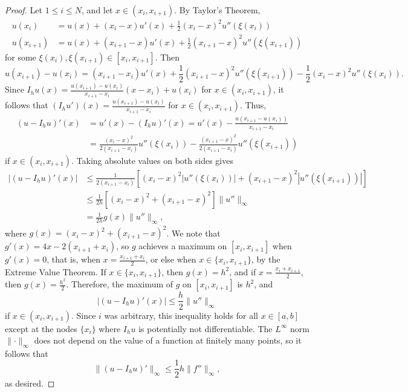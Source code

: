 \documentclass{homework}
\begin{document}
\begin{proof}
		Let $1 \le i \le N$, and let $x \in (x_i, x_{i+1})$. By Taylor's Theorem,
		\begin{align}
			u(x_i) &= u(x) + (x_i -x)u'(x) + \frac{1}{2}(x_i-x)^2u''(\xi(x_i)) \\
			u(x_{i+1}) &= u(x) + (x_{i+1} - x)u'(x) + \frac{1}{2}(x_{i+1}-x)^2u''(\xi(x_{i+1}))
		\end{align}
		for some $\xi(x_i), \xi(x_{i+1}) \in [x_i, x_{i+1}]$. Then
		\begin{equation}
			u(x_{i+1}) - u(x_i) = (x_{i+1} -x_i)u'(x) + \frac{1}{2}(x_{i+1}-x)^2u''(\xi(x_{i+1})) - \frac{1}{2}(x_i-x)^2u''(\xi(x_i)).
		\end{equation}
		Since $I_hu(x) = \frac{u(x_{i+1})- u(x_i)}{x_{i+1} - x_i}(x-x_i) + u(x_i)$ for $x \in (x_i, x_{i+1})$, it follows that $(I_hu')(x) = \frac{u(x_{i+1})- u(x_i)}{x_{i+1} - x_i}$ for $x \in (x_i, x_{i+1})$. Thus,
		\begin{align}
			(u-I_hu)'(x) &= u'(x) - (I_hu)'(x) = u'(x) - \frac{u(x_{i+1} - u(x_i))}{x_{i+1}-x_i} \\
			&= \frac{(x_i-x)^2}{2(x_{i+1}-x_i)}u''(\xi(x_i)) - \frac{(x_{i+1}-x)^2}{2(x_{i+1}-x_i)}u''(\xi(x_{i+1}))
		\end{align}
		if $x \in (x_i, x_{i+1})$. Taking absolute values on both sides gives
		\begin{align}
			|(u-I_hu)'(x)| &\le \frac{1}{2(x_{i+1}-x_i)}\left[(x_i-x)^2|u''(\xi(x_i))| + (x_{i+1}-x)^2|u''(\xi(x_{i+1}))|\right] \\
			&\le \frac{1}{2h}\left[(x_i-x)^2 + (x_{i+1}-x)^2\right]\lVert u'' \rVert_\infty \\
			&= \frac{1}{2h}g(x)\lVert u'' \rVert_\infty,
		\end{align}
		where $g(x) = (x_i-x)^2 + (x_{i+1}-x)^2$. We note that $g'(x) = 4x - 2(x_{i+1} + x_i)$, so $g$ achieves a maximum on $[x_i, x_{i+1}]$ when $g'(x) = 0$, that is, when $x = \frac{x_{i+1}+x_i}{2}$, or else when $x \in \{x_i, x_{i+1}\}$, by the Extreme Value Theorem. If $x \in \{x_i, x_{i+1}\}$, then $g(x) = h^2$, and if $x = \frac{x_i + x_{i+1}}{2}$, then $g(x) = \frac{h^2}{2}$. Therefore, the maximum of $g$ on $[x_i,x_{i+1}]$ is $h^2$, and
		\begin{equation}
			|(u-I_hu)'(x)| \le \frac{h}{2}\lVert u'' \rVert_\infty
		\end{equation}
		if $x \in (x_i, x_{i+1})$. Since $i$ was arbitrary, this inequality holds for all $x \in [a,b]$ except at the nodes $\{x_i\}$ where $I_hu$ is potentially not differentiable. The $L^\infty$ norm $\lVert \cdot \rVert_\infty$ does not depend on the value of a function at finitely many points, so it follows that
		\begin{equation}
			\lVert (u-I_hu)'\rVert_\infty \le \frac{1}{2}h\lVert f''\rVert_\infty,
		\end{equation}
		as desired.
	\end{proof}
	
\end{document}
